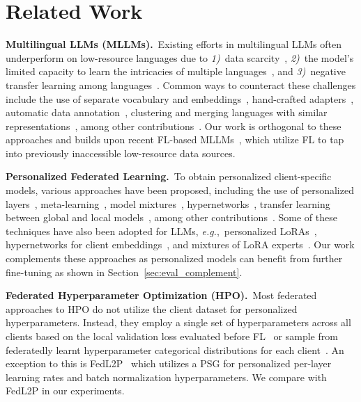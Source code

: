 \section{Related Work}
\label{sec:related}

\noindent\textbf{Multilingual LLMs (MLLMs).}~Existing efforts in multilingual LLMs often underperform on low-resource languages due to \textit{1)}~data scarcity~\cite{xu2024survey}, \textit{2)}~the model's limited capacity to learn the intricacies of multiple languages~\cite{conneau-etal-2020-unsupervised}, and \textit{3)}~negative transfer learning among languages~\cite{wang2020negative}.
Common ways to counteract these challenges include the use of separate vocabulary and embeddings~\cite{artetxe2020cross}, hand-crafted adapters~\cite{pfeiffer2020mad}, automatic data annotation~\cite{llama3}, clustering and merging languages with similar representations~\cite{chung2020improving}, among other contributions~\cite{wang2020extending,Conneau2019UnsupervisedCR}. Our work is orthogonal to these approaches and builds upon recent FL-based MLLMs~\cite{zhao2023breaking,DEPT,fedllm-bench}, which utilize FL to tap into previously inaccessible low-resource data sources.

\noindent\textbf{Personalized Federated Learning.}~To obtain personalized client-specific models, various approaches have been proposed, including the use of personalized layers~\cite{fedper}, meta-learning~\cite{fedmeta}, model mixtures~\cite{fedem}, hypernetworks~\cite{pfedhn}, transfer learning between global and local models~\cite{fml}, among other contributions~\cite{apfl}. Some of these techniques have also been adopted for LLMs, \textit{e.g.},~personalized LoRAs~\cite{FedDPA}, hypernetworks for client embeddings~\cite{FedPerC}, and mixtures of LoRA experts~\cite{FedAMoLE}. Our work complements these approaches as personalized models can benefit from further fine-tuning as shown in Section~\ref{sec:eval_complement}.

\noindent\textbf{Federated Hyperparameter Optimization (HPO).}~Most federated approaches to HPO do not utilize the client dataset for personalized hyperparameters. Instead, they employ a single set of hyperparameters across all clients based on the local validation loss evaluated before FL~\cite{flora,holly2022evaluation} or sample from federatedly learnt hyperparameter categorical distributions for each client~\cite{fedex}. An exception to this is FedL2P~\cite{royson2023fedl2p} which utilizes a PSG for personalized per-layer learning rates and batch normalization hyperparameters. We compare with FedL2P in our experiments.

